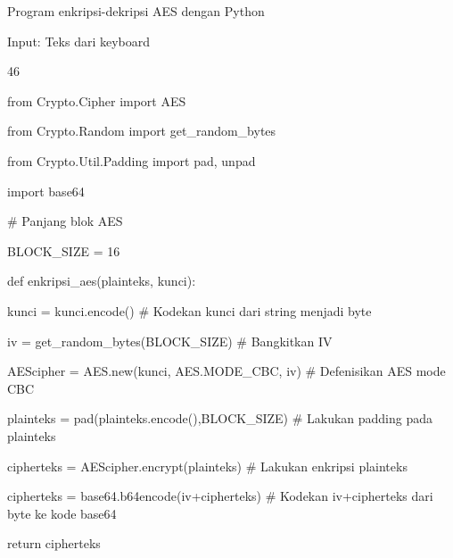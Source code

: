 \documentclass{article}
\begin{document}

Program enkripsi-dekripsi AES dengan Python

Input: Teks dari keyboard

46

from Crypto.Cipher import AES

from Crypto.Random import get\_random\_bytes

from Crypto.Util.Padding import pad, unpad

import base64

\# Panjang blok AES

BLOCK\_SIZE = 16

def enkripsi\_aes(plainteks, kunci):                     

    kunci = kunci.encode()                              \# Kodekan kunci dari string menjadi byte

    iv = get\_random\_bytes(BLOCK\_SIZE)                   \# Bangkitkan IV

    AEScipher = AES.new(kunci, AES.MODE\_CBC, iv)        \# Defenisikan AES mode CBC


    plainteks = pad(plainteks.encode(),BLOCK\_SIZE)      \# Lakukan padding pada plainteks      


    cipherteks = AEScipher.encrypt(plainteks)           \# Lakukan enkripsi plainteks 

    cipherteks = base64.b64encode(iv+cipherteks)        \# Kodekan iv+cipherteks dari byte ke kode base64

    return cipherteks
\end{document}
